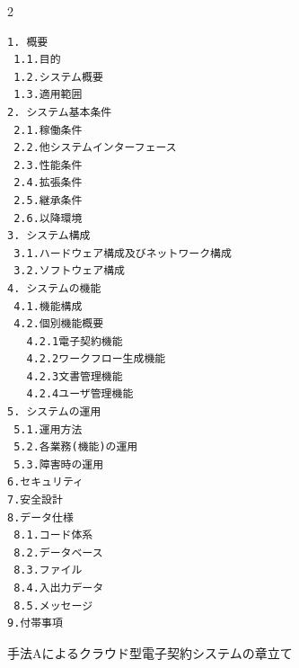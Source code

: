 \begin{figure}[htbp]
\begin{tcolorbox}[
  colback=white,
  colframe=black,
  fonttitle=\bfseries
]
\begin{multicols}{2}
\footnotesize
\ttfamily
\fontsize{11}{12}\selectfont
\begin{verbatim}
1. 概要
 1.1.目的
 1.2.システム概要
 1.3.適用範囲
2. システム基本条件
 2.1.稼働条件
 2.2.他システムインターフェース
 2.3.性能条件
 2.4.拡張条件
 2.5.継承条件
 2.6.以降環境
3. システム構成
 3.1.ハードウェア構成及びネットワーク構成
 3.2.ソフトウェア構成
4. システムの機能
 4.1.機能構成
 4.2.個別機能概要
   4.2.1電子契約機能
   4.2.2ワークフロー生成機能
   4.2.3文書管理機能
   4.2.4ユーザ管理機能
5. システムの運用
 5.1.運用方法
 5.2.各業務(機能)の運用
 5.3.障害時の運用
6.セキュリティ
7.安全設計
8.データ仕様
 8.1.コード体系
 8.2.データベース
 8.3.ファイル
 8.4.入出力データ
 8.5.メッセージ
9.付帯事項
\end{verbatim}
\end{multicols}
\end{tcolorbox}
\caption{手法Aによるクラウド型電子契約システムの章立て}
\label{fig:A_chapter_structure_of_cloud_contract_system}
\end{figure}



